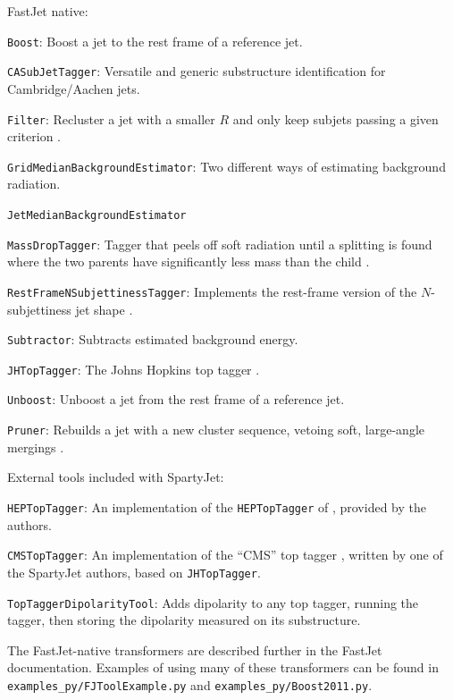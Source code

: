 \documentclass{article}
\newcommand{\prog}[1]{{\sc #1}\xspace}
\newcommand{\code}[1]{{\tt #1}\xspace}
\newcommand{\SJ}[0]{\prog{SpartyJet}}
\newcommand{\FJ}[0]{\prog{FastJet}}
\begin{document}
\FJ native:
\begin{description}
\item \code{Boost}:  Boost a jet to the rest frame of a reference jet.
\item \code{CASubJetTagger}:  Versatile and generic substructure identification for Cambridge/Aachen jets.
\item \code{Filter}:  Recluster a jet with a smaller $R$ and only keep subjets passing a given criterion \cite{BDRS}.
\item \code{GridMedianBackgroundEstimator}: Two different ways of estimating background radiation.
\item \code{JetMedianBackgroundEstimator}
\item \code{MassDropTagger}: Tagger that peels off soft radiation until a splitting is found where the two parents have significantly less mass than the child \cite{BDRS}.
\item \code{RestFrameNSubjettinessTagger}: Implements the rest-frame version of the $N$-subjettiness jet shape \cite{RestFrameNSub}.
\item \code{Subtractor}: Subtracts estimated background energy.
\item \code{JHTopTagger}: The Johns Hopkins top tagger \cite{JH}.
\item \code{Unboost}: Unboost a jet from the rest frame of a reference jet.
\item \code{Pruner}: Rebuilds a jet with a new cluster sequence, vetoing soft, large-angle mergings \cite{Prune1, Prune2}.
\end{description}

External tools included with \SJ:
\begin{description}
\item \code{HEPTopTagger}: An implementation of the \code{HEPTopTagger} of \cite{HEP1, HEP2}, provided by the authors.
\item \code{CMSTopTagger}: An implementation of the ``CMS'' top tagger \cite{CMS1, CMS2}, written by one of the \SJ authors, based on \code{JHTopTagger}.
\item \code{TopTaggerDipolarityTool}: Adds dipolarity \cite{Dipolarity} to any top tagger, running the tagger, then storing the dipolarity measured on its substructure.
\end{description}

The \FJ-native transformers are described further in the \FJ documentation.  Examples of using many of these transformers can be found in \verb+examples_py/FJToolExample.py+ and \verb+examples_py/Boost2011.py+.
\end{document}
